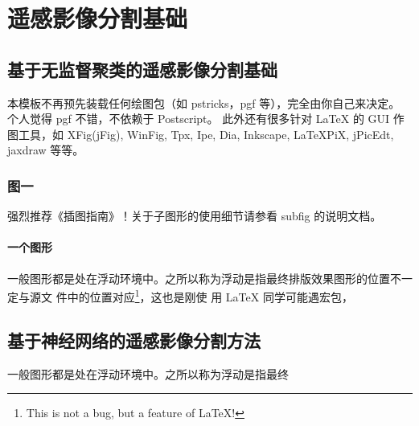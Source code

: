 
\chapter{遥感影像分割基础}
\label{cha:chap02}

\section{基于无监督聚类的遥感影像分割基础}
\label{sec:other}


本模板不再预先装载任何绘图包（如 \textsf{pstricks，pgf} 等），完全由你自己来决定。
个人觉得 \textsf{pgf} 不错，不依赖于 Postscript。 此外还有很多针对 \LaTeX{} 的
GUI 作图工具，如 XFig(jFig), WinFig, Tpx, Ipe, Dia, Inkscape, LaTeXPiX,
jPicEdt, jaxdraw 等等。

\subsection{图一}
\label{sec:graphs}

强烈推荐《\LaTeXe 插图指南》！关于子图形的使用细节请参看 \textsf{subfig} 的说明文档。

\subsubsection{一个图形}
\label{sec:onefig}
一般图形都是处在浮动环境中。之所以称为浮动是指最终排版效果图形的位置不一定与源文
件中的位置对应\footnote{This is not a bug, but a feature of \LaTeX!}，这也是刚使
用 \LaTeX{} 同学可能遇宏包，

\section{基于神经网络的遥感影像分割方法}
\label{sec:chap02-2}

一般图形都是处在浮动环境中。之所以称为浮动是指最终


